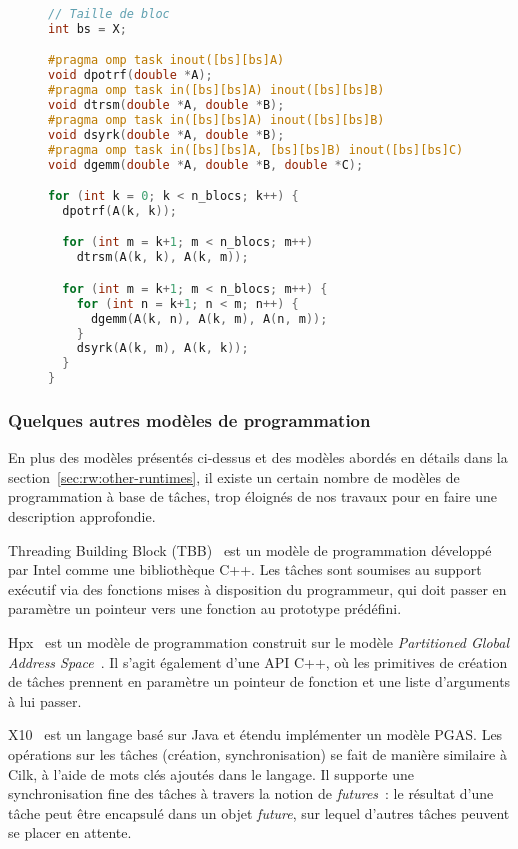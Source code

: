 \begin{figure}[h!]
\begin{lstlisting}[language=c++,caption=Cholesky exprimé en OmpSs,label=lst:context:cholesky-ompss]
// Taille de bloc
int bs = X;

#pragma omp task inout([bs][bs]A)
void dpotrf(double *A);
#pragma omp task in([bs][bs]A) inout([bs][bs]B)
void dtrsm(double *A, double *B);
#pragma omp task in([bs][bs]A) inout([bs][bs]B)
void dsyrk(double *A, double *B);
#pragma omp task in([bs][bs]A, [bs][bs]B) inout([bs][bs]C)
void dgemm(double *A, double *B, double *C);

for (int k = 0; k < n_blocs; k++) {
  dpotrf(A(k, k));

  for (int m = k+1; m < n_blocs; m++)
    dtrsm(A(k, k), A(k, m));

  for (int m = k+1; m < n_blocs; m++) {
    for (int n = k+1; n < m; n++) {
      dgemm(A(k, n), A(k, m), A(n, m));
    }
    dsyrk(A(k, m), A(k, k));
  }
}
\end{lstlisting}
\end{figure}


\subsubsection{Quelques autres modèles de programmation}

En plus des modèles présentés ci-dessus et des modèles abordés en détails dans la section~\ref{sec:rw:other-runtimes}, il existe un certain nombre de modèles de programmation à base de tâches, trop éloignés de nos travaux pour en faire une description approfondie.

Threading Building Block (TBB)~\cite{Reinders2007} est un modèle de programmation développé par Intel comme une bibliothèque C++.
Les tâches sont soumises au support exécutif via des fonctions mises à disposition du programmeur, qui doit passer en paramètre un pointeur vers une fonction au prototype prédéfini.

Hpx~\cite{Kaiser2014} est un modèle de programmation construit sur le modèle \emph{Partitioned Global Address Space}~\cite{PGAS}.
Il s'agit également d'une API C++, où les primitives de création de tâches prennent en paramètre un pointeur de fonction et une liste d'arguments à lui passer.

X10~\cite{Charles2005} est un langage basé sur Java et étendu implémenter un modèle PGAS.
Les opérations sur les tâches (création, synchronisation) se fait de manière similaire à Cilk, à l'aide de mots clés ajoutés dans le langage.
Il supporte une synchronisation fine des tâches à travers la notion de \emph{futures}~: le résultat d'une tâche peut être encapsulé dans un objet \emph{future}, sur lequel d'autres tâches peuvent se placer en attente.


